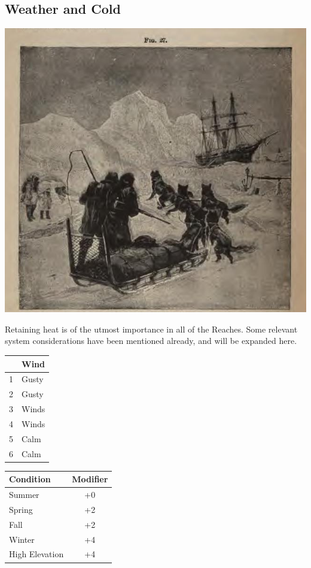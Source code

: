 \documentclass[notitlepage]{article}
\begin{document}
\begin{multicols*}{2}
\subsection*{Weather and Cold}

{\centering \includegraphics[width=\columnwidth]{arctic-sledders}
}

Retaining heat is of the utmost importance in all of the Reaches.
Some relevant system considerations have been mentioned already, and will be expanded here. \\



\begin{table}[t]
  \centering \large
  
  \begin{tabular}{|c||p{}|}
    \hline
      & Wind \\ \hline
    1 & Gusty \\
    2 & Gusty \\
    3 & Winds \\
    4 & Winds \\
    5 & Calm \\
    6 & Calm \\ \hline
  \end{tabular}
  \begin{tabular}{|p{}||c|}
    \hline Condition & Modifier \\ \hline
    Summer & +0 \\
    Spring & +2 \\
    Fall & +2 \\
    Winter & +4 \\
    High Elevation & +4 \\ \hline
  \end{tabular}  \\


\end{table}
\end{multicols*}
\end{document}

